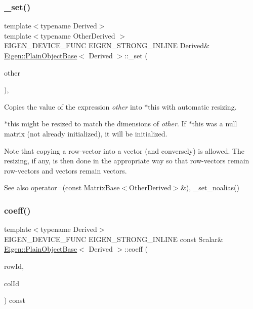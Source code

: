 \subsubsection{\texorpdfstring{\_set()}{\_set()}}
{\footnotesize\ttfamily template$<$typename Derived$>$ \\
template$<$typename Other\+Derived $>$ \\
E\+I\+G\+E\+N\+\_\+\+D\+E\+V\+I\+C\+E\+\_\+\+F\+U\+NC E\+I\+G\+E\+N\+\_\+\+S\+T\+R\+O\+N\+G\+\_\+\+I\+N\+L\+I\+NE Derived\& \mbox{\hyperlink{class_eigen_1_1_plain_object_base}{Eigen\+::\+Plain\+Object\+Base}}$<$ Derived $>$\+::\+\_\+set (\begin{DoxyParamCaption}\item[{const \mbox{\hyperlink{class_eigen_1_1_dense_base}{Dense\+Base}}$<$ Other\+Derived $>$ \&}]{other }\end{DoxyParamCaption})\hspace{0.3cm}{\ttfamily [inline]}, {\ttfamily [protected]}}



Copies the value of the expression {\itshape other} into {\ttfamily $\ast$this} with automatic resizing. 

$\ast$this might be resized to match the dimensions of {\itshape other}. If $\ast$this was a null matrix (not already initialized), it will be initialized.

Note that copying a row-\/vector into a vector (and conversely) is allowed. The resizing, if any, is then done in the appropriate way so that row-\/vectors remain row-\/vectors and vectors remain vectors.

\begin{DoxySeeAlso}{See also}
operator=(const Matrix\+Base$<$\+Other\+Derived$>$\&), \+\_\+set\+\_\+noalias() 
\end{DoxySeeAlso}
\mbox{\label{class_eigen_1_1_plain_object_base_afbfc12954f16d21aedb7bd839f64a278}} 
\subsubsection{\texorpdfstring{coeff()}{coeff()}\hspace{0.1cm}{\footnotesize\ttfamily [1/2]}}
{\footnotesize\ttfamily template$<$typename Derived$>$ \\
E\+I\+G\+E\+N\+\_\+\+D\+E\+V\+I\+C\+E\+\_\+\+F\+U\+NC E\+I\+G\+E\+N\+\_\+\+S\+T\+R\+O\+N\+G\+\_\+\+I\+N\+L\+I\+NE const Scalar\& \mbox{\hyperlink{class_eigen_1_1_plain_object_base}{Eigen\+::\+Plain\+Object\+Base}}$<$ Derived $>$\+::coeff (\begin{DoxyParamCaption}\item[{Index}]{row\+Id,  }\item[{Index}]{col\+Id }\end{DoxyParamCaption}) const\hspace{0.3cm}{\ttfamily [inline]}}

